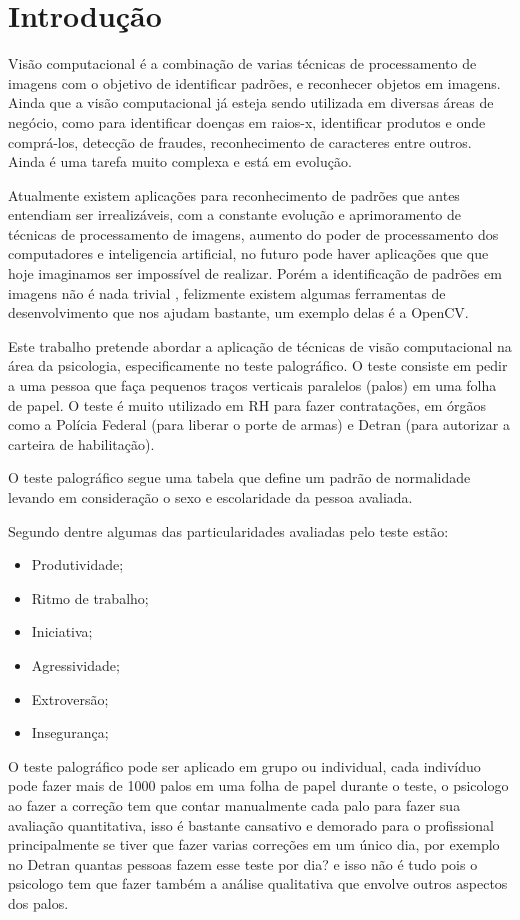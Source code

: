 \chapter{Introdução}
\label{cap:intro}

Visão computacional é a combinação de varias técnicas de processamento de imagens  com o objetivo de identificar padrões, e reconhecer objetos em imagens. Ainda que a visão computacional já esteja sendo utilizada em diversas áreas de negócio, como para identificar doenças em raios-x, identificar produtos e onde comprá-los, detecção de fraudes, reconhecimento de caracteres entre outros. Ainda é uma tarefa muito complexa e está em evolução. \cite{dsAcademy2017}

Atualmente existem aplicações para  reconhecimento de padrões que antes entendiam ser irrealizáveis, com a constante evolução e aprimoramento de técnicas de processamento de imagens, aumento do poder de processamento dos computadores e inteligencia artificial, no futuro pode haver aplicações que que hoje  imaginamos ser impossível de realizar. Porém a identificação de padrões em imagens não é nada trivial \cite{rios2010}, felizmente existem algumas ferramentas de desenvolvimento  que nos ajudam bastante, um exemplo delas é a OpenCV.

Este trabalho pretende abordar a aplicação de técnicas de visão computacional na área da psicologia, especificamente no teste palográfico. O teste consiste em pedir a uma pessoa que faça pequenos traços verticais paralelos (palos) em uma folha de papel. O teste é muito utilizado em RH para fazer contratações, em órgãos como a Polícia Federal (para liberar o porte de armas) e Detran (para autorizar a carteira de habilitação).\cite{kenoby2017}

O teste palográfico segue uma tabela que define um padrão de normalidade levando em consideração o sexo e escolaridade da pessoa avaliada.

Segundo \cite{psicohood2018} dentre algumas das particularidades avaliadas pelo teste estão:

\begin{itemize}
\item Produtividade;
\item Ritmo de trabalho;
\item Iniciativa;
\item Agressividade;
\item Extroversão;
\item Insegurança;

 
\end{itemize}
O teste palográfico pode ser aplicado em grupo ou individual, cada indivíduo pode fazer mais de 1000 palos em uma folha de papel durante o teste, o psicologo ao fazer a correção tem que contar manualmente cada palo  para fazer sua avaliação quantitativa, isso é bastante cansativo e demorado para o profissional principalmente se tiver que fazer varias correções em um único dia, por exemplo no Detran quantas pessoas fazem esse teste por dia? e isso não é tudo pois o psicologo tem que fazer também a análise qualitativa que envolve outros aspectos dos palos. 

